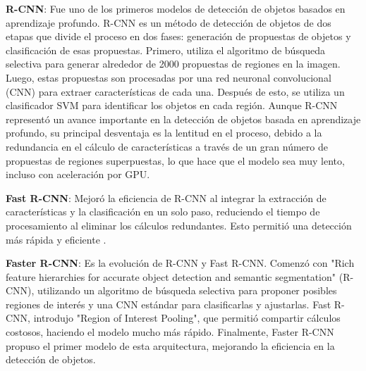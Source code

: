 \textbf{R-CNN}: Fue uno de los primeros modelos de detección de objetos basados en aprendizaje profundo. R-CNN es un método de detección de objetos de dos etapas que divide el proceso en dos fases: generación de propuestas de objetos y clasificación de esas propuestas. Primero, utiliza el algoritmo de búsqueda selectiva para generar alrededor de 2000 propuestas de regiones en la imagen. Luego, estas propuestas son procesadas por una red neuronal convolucional (CNN) para extraer características de cada una. Después de esto, se utiliza un clasificador SVM para identificar los objetos en cada región. Aunque R-CNN representó un avance importante en la detección de objetos basada en aprendizaje profundo, su principal desventaja es la lentitud en el proceso, debido a la redundancia en el cálculo de características a través de un gran número de propuestas de regiones superpuestas, lo que hace que el modelo sea muy lento, incluso con aceleración por GPU\cite{wang2024yolosurvey}\cite{sapkota2025yolo}.

\textbf{Fast R-CNN}: Mejoró la eficiencia de R-CNN al integrar la extracción de características y la clasificación en un solo paso, reduciendo el tiempo de procesamiento al eliminar los cálculos redundantes. Esto permitió una detección más rápida y eficiente \cite{sapkota2025yolo}.

\textbf{Faster R-CNN}: Es la evolución de R-CNN y Fast R-CNN. Comenzó con "Rich feature hierarchies for accurate object detection and semantic segmentation" (R-CNN), utilizando un algoritmo de búsqueda selectiva para proponer posibles regiones de interés y una CNN estándar para clasificarlas y ajustarlas. Fast R-CNN, introdujo "Region of Interest Pooling", que permitió compartir cálculos costosos, haciendo el modelo mucho más rápido. Finalmente, Faster R-CNN propuso el primer modelo de esta arquitectura, mejorando la eficiencia en la detección de objetos\cite{centeno2019deep}\cite{sanchez2020evaluacion}.

